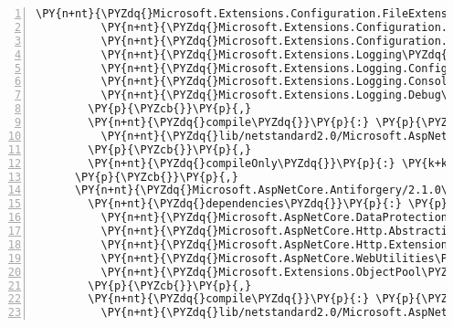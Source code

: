\begin{Verbatim}[commandchars=\\\{\},numbers=left,firstnumber=1,stepnumber=1,numberblanklines=0]
          \PY{n+nt}{\PYZdq{}Microsoft.Extensions.Configuration.FileExtensions\PYZdq{}}\PY{p}{:} \PY{l+s+s2}{\PYZdq{}2.1.0\PYZhy{}rc1\PYZhy{}final\PYZdq{}}\PY{p}{,}
          \PY{n+nt}{\PYZdq{}Microsoft.Extensions.Configuration.Json\PYZdq{}}\PY{p}{:} \PY{l+s+s2}{\PYZdq{}2.1.0\PYZhy{}rc1\PYZhy{}final\PYZdq{}}\PY{p}{,}
          \PY{n+nt}{\PYZdq{}Microsoft.Extensions.Configuration.UserSecrets\PYZdq{}}\PY{p}{:} \PY{l+s+s2}{\PYZdq{}2.1.0\PYZhy{}rc1\PYZhy{}final\PYZdq{}}\PY{p}{,}
          \PY{n+nt}{\PYZdq{}Microsoft.Extensions.Logging\PYZdq{}}\PY{p}{:} \PY{l+s+s2}{\PYZdq{}2.1.0\PYZhy{}rc1\PYZhy{}final\PYZdq{}}\PY{p}{,}
          \PY{n+nt}{\PYZdq{}Microsoft.Extensions.Logging.Configuration\PYZdq{}}\PY{p}{:} \PY{l+s+s2}{\PYZdq{}2.1.0\PYZhy{}rc1\PYZhy{}final\PYZdq{}}\PY{p}{,}
          \PY{n+nt}{\PYZdq{}Microsoft.Extensions.Logging.Console\PYZdq{}}\PY{p}{:} \PY{l+s+s2}{\PYZdq{}2.1.0\PYZhy{}rc1\PYZhy{}final\PYZdq{}}\PY{p}{,}
          \PY{n+nt}{\PYZdq{}Microsoft.Extensions.Logging.Debug\PYZdq{}}\PY{p}{:} \PY{l+s+s2}{\PYZdq{}2.1.0\PYZhy{}rc1\PYZhy{}final\PYZdq{}}
        \PY{p}{\PYZcb{}}\PY{p}{,}
        \PY{n+nt}{\PYZdq{}compile\PYZdq{}}\PY{p}{:} \PY{p}{\PYZob{}}
          \PY{n+nt}{\PYZdq{}lib/netstandard2.0/Microsoft.AspNetCore.dll\PYZdq{}}\PY{p}{:} \PY{p}{\PYZob{}}\PY{p}{\PYZcb{}}
        \PY{p}{\PYZcb{}}\PY{p}{,}
        \PY{n+nt}{\PYZdq{}compileOnly\PYZdq{}}\PY{p}{:} \PY{k+kc}{true}
      \PY{p}{\PYZcb{}}\PY{p}{,}
      \PY{n+nt}{\PYZdq{}Microsoft.AspNetCore.Antiforgery/2.1.0\PYZhy{}rc1\PYZhy{}final\PYZdq{}}\PY{p}{:} \PY{p}{\PYZob{}}
        \PY{n+nt}{\PYZdq{}dependencies\PYZdq{}}\PY{p}{:} \PY{p}{\PYZob{}}
          \PY{n+nt}{\PYZdq{}Microsoft.AspNetCore.DataProtection\PYZdq{}}\PY{p}{:} \PY{l+s+s2}{\PYZdq{}2.1.0\PYZhy{}rc1\PYZhy{}final\PYZdq{}}\PY{p}{,}
          \PY{n+nt}{\PYZdq{}Microsoft.AspNetCore.Http.Abstractions\PYZdq{}}\PY{p}{:} \PY{l+s+s2}{\PYZdq{}2.1.0\PYZhy{}rc1\PYZhy{}final\PYZdq{}}\PY{p}{,}
          \PY{n+nt}{\PYZdq{}Microsoft.AspNetCore.Http.Extensions\PYZdq{}}\PY{p}{:} \PY{l+s+s2}{\PYZdq{}2.1.0\PYZhy{}rc1\PYZhy{}final\PYZdq{}}\PY{p}{,}
          \PY{n+nt}{\PYZdq{}Microsoft.AspNetCore.WebUtilities\PYZdq{}}\PY{p}{:} \PY{l+s+s2}{\PYZdq{}2.1.0\PYZhy{}rc1\PYZhy{}final\PYZdq{}}\PY{p}{,}
          \PY{n+nt}{\PYZdq{}Microsoft.Extensions.ObjectPool\PYZdq{}}\PY{p}{:} \PY{l+s+s2}{\PYZdq{}2.1.0\PYZhy{}rc1\PYZhy{}final\PYZdq{}}
        \PY{p}{\PYZcb{}}\PY{p}{,}
        \PY{n+nt}{\PYZdq{}compile\PYZdq{}}\PY{p}{:} \PY{p}{\PYZob{}}
          \PY{n+nt}{\PYZdq{}lib/netstandard2.0/Microsoft.AspNetCore.Antiforgery.dll\PYZdq{}}\PY{p}{:} \PY{p}{\PYZob{}}\PY{p}{\PYZcb{}}

\end{Verbatim}
